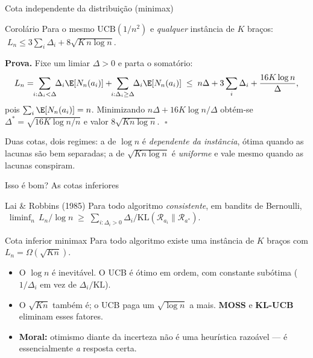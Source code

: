 \documentclass[aspectratio=169, 11pt]{beamer}
\newcommand{\ucb}{\mathrm{UCB}}
\newcommand{\Dist}{\mathcal{R}}
\begin{document}
\begin{frame}{Cota independente da distribuição (minimax)}
  \begin{teobox}{Corolário}
    Para o mesmo $\ucb(1/n^{2})$ e \emph{qualquer} instância de $K$ braços:
    $\;L_n \le 3\sum_{i}\Delta_i + 8\sqrt{K\,n\log n}$.
  \end{teobox}

  {\small\textbf{Prova.} Fixe um limiar $\Delta>0$ e parta o somatório:
  \[
    L_n = \!\!\sum_{i:\Delta_i<\Delta}\!\!\Delta_i\E[N_n(a_i)]
        + \!\!\sum_{i:\Delta_i\ge\Delta}\!\!\Delta_i\E[N_n(a_i)]
      \;\le\; n\Delta + 3\sum_i\Delta_i + \frac{16K\log n}{\Delta},
  \]
  pois $\sum_i \E[N_n(a_i)]=n$. Minimizando $n\Delta + 16K\log n/\Delta$
  obtém-se $\Delta^{*}=\sqrt{16K\log n/n}$ e valor $8\sqrt{Kn\log n}$.
  $\;\square$}

  \begin{ideiabox}
    Duas cotas, dois regimes: a de $\log n$ é \emph{dependente da instância},
    ótima quando as lacunas são bem separadas; a de $\sqrt{Kn\log n}$ é
    \emph{uniforme} e vale mesmo quando as lacunas conspiram.
  \end{ideiabox}
\end{frame}

\begin{frame}{Isso é bom? As cotas inferiores}
  \begin{teobox}{Lai \& Robbins (1985)}
    Para todo algoritmo \emph{consistente}, em bandits de Bernoulli,
    $\;\liminf_{n}\, L_n/\log n \;\ge\; \sum_{i:\Delta_i>0}
      \Delta_i / \mathrm{KL}(\Dist_{a_i}\|\Dist_{a^{*}})$.
  \end{teobox}
  \vspace{-0.3em}
  \begin{teobox}{Cota inferior minimax}
    Para todo algoritmo existe uma instância de $K$ braços com
    $L_n = \Omega(\sqrt{Kn})$.
  \end{teobox}

  {\small
  \begin{itemize}\setlength{\itemsep}{0.2ex}
    \item O $\log n$ é \alert{inevitável}. O UCB é ótimo em ordem, com
          constante subótima ($1/\Delta_i$ em vez de $\Delta_i/\mathrm{KL}$).
    \item O $\sqrt{Kn}$ também é; o UCB paga um $\sqrt{\log n}$ a mais.
          \textbf{MOSS} e \textbf{KL-UCB} eliminam esses fatores.
    \item \textbf{Moral:} otimismo diante da incerteza não é uma heurística
          razoável --- é essencialmente \emph{a} resposta certa.
  \end{itemize}}
\end{frame}
\end{document}
